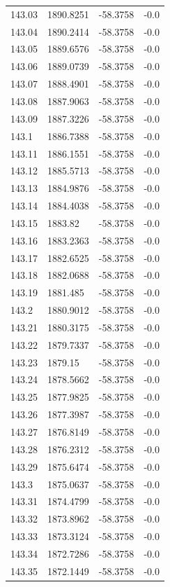 \begin{table}[H]
\begin{tabular}{llll}
143.03 & 1890.8251 & -58.3758 & -0.0 \\
143.04 & 1890.2414 & -58.3758 & -0.0 \\
143.05 & 1889.6576 & -58.3758 & -0.0 \\
143.06 & 1889.0739 & -58.3758 & -0.0 \\
143.07 & 1888.4901 & -58.3758 & -0.0 \\
143.08 & 1887.9063 & -58.3758 & -0.0 \\
143.09 & 1887.3226 & -58.3758 & -0.0 \\
143.1 & 1886.7388 & -58.3758 & -0.0 \\
143.11 & 1886.1551 & -58.3758 & -0.0 \\
143.12 & 1885.5713 & -58.3758 & -0.0 \\
143.13 & 1884.9876 & -58.3758 & -0.0 \\
143.14 & 1884.4038 & -58.3758 & -0.0 \\
143.15 & 1883.82 & -58.3758 & -0.0 \\
143.16 & 1883.2363 & -58.3758 & -0.0 \\
143.17 & 1882.6525 & -58.3758 & -0.0 \\
143.18 & 1882.0688 & -58.3758 & -0.0 \\
143.19 & 1881.485 & -58.3758 & -0.0 \\
143.2 & 1880.9012 & -58.3758 & -0.0 \\
143.21 & 1880.3175 & -58.3758 & -0.0 \\
143.22 & 1879.7337 & -58.3758 & -0.0 \\
143.23 & 1879.15 & -58.3758 & -0.0 \\
143.24 & 1878.5662 & -58.3758 & -0.0 \\
143.25 & 1877.9825 & -58.3758 & -0.0 \\
143.26 & 1877.3987 & -58.3758 & -0.0 \\
143.27 & 1876.8149 & -58.3758 & -0.0 \\
143.28 & 1876.2312 & -58.3758 & -0.0 \\
143.29 & 1875.6474 & -58.3758 & -0.0 \\
143.3 & 1875.0637 & -58.3758 & -0.0 \\
143.31 & 1874.4799 & -58.3758 & -0.0 \\
143.32 & 1873.8962 & -58.3758 & -0.0 \\
143.33 & 1873.3124 & -58.3758 & -0.0 \\
143.34 & 1872.7286 & -58.3758 & -0.0 \\
143.35 & 1872.1449 & -58.3758 & -0.0 \\

\end{tabular}
\end{table}
